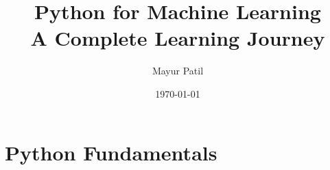 \documentclass[11pt,a4paper]{book}
\title{\Huge\textbf{Python for Machine Learning} \\ \vspace{0.5cm} \Large A Complete Learning Journey}
\author{Mayur Patil}
\date{\today}
\begin{document}
\maketitle
\tableofcontents

\part{Python Fundamentals}
% 










\end{document}
